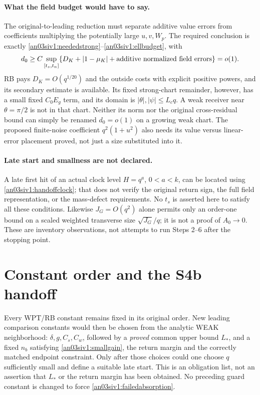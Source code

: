 \documentclass[11pt]{article}
\numberwithin{equation}{section}
\theoremstyle{remark}\newtheorem{remark}[proposition]{Remark}
\begin{document}
\paragraph{What the field budget would have to say.}
The original-to-leading reduction must separate additive value errors
from coefficients multiplying the potentially large $u,v,W_p$.
The required conclusion is exactly
\eqref{an03siv1:neededstrong}--\eqref{an03siv1:ellbudget}, with
\[
 d_0\ge C\sup_{[t_s,t_n]}
   \{D_K+|1-\mu_K|+\hbox{additive normalized field errors}\}=o(1).
\]
RB pays $D_K=O(q^{1/20})$ and the outside costs with explicit
positive powers, and its secondary estimate is available.
Its fixed strong-chart remainder, however, has a small fixed
$C_0E_g$ term, and its domain is $|\theta|,|\psi|\le L_cq$.
A weak receiver near $\theta=\pi/2$ is not in that chart.
Neither its norm nor the original cross-residual bound can simply
be renamed $d_0=o(1)$ on a growing weak chart. The proposed
finite-noise coefficient $q^2(1+u^2)$ also needs its value versus
linear-error placement proved, not just a size substituted into it.

\paragraph{Late start and smallness are not declared.}
A late first hit of an actual clock level $H=q^a$, $0<a<k$, can
be located using \eqref{an03siv1:handoffclock}; that does not verify
the original return sign, the full field representation, or the
mass-defect requirements. No $t_s$ is asserted here to satisfy all
these conditions. Likewise $J_G=O(q^2)$ alone permits only an
order-one bound on a scaled weighted transverse size
$\sqrt{J_G}/q$; it is not a proof of $A_0\to0$.
These are inventory observations, not attempts to run Steps 2--6
after the stopping point.

\section{Constant order and the S4b handoff}
\label{an03siv1:handoff}
Every WPT/RB constant remains fixed in its original order. New
leading comparison constants would then be chosen from the analytic
WEAK neighborhood: $\delta,g,C_s,C_w$, followed by a \emph{proved}
common upper bound $L_*$, and a fixed $n_b$ satisfying
\eqref{an03siv1:smallgain}, the return margin and the correctly
matched endpoint constraint. Only after those choices could one
choose $q$ sufficiently small and define a suitable late start.
This is an obligation list, not an assertion that $L_*$ or the
return margin has been obtained. No preceding guard constant is
changed to force \eqref{an03siv1:failedabsorption}.
\end{document}
